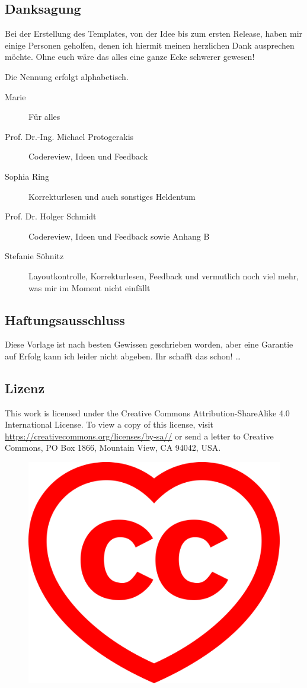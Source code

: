 \subsection{Danksagung}%
\label{sec:thx}
Bei der Erstellung des Templates, von der Idee bis zum ersten Release, haben mir einige Personen geholfen, denen ich hiermit meinen herzlichen Dank ausprechen möchte. Ohne euch wäre das alles eine ganze Ecke schwerer gewesen! 

Die Nennung erfolgt alphabetisch.
\begin{description}
  \item[Marie] Für alles
  \item[Prof. Dr.-Ing. Michael Protogerakis] Codereview, Ideen und Feedback
  \item[Sophia Ring] Korrekturlesen und auch sonstiges Heldentum
  \item[Prof. Dr. Holger Schmidt] Codereview, Ideen und Feedback sowie Anhang B
  \item[Stefanie Söhnitz] Layoutkontrolle, Korrekturlesen, Feedback und ver\-mut\-lich noch viel mehr, was mir im Moment nicht einfällt
\end{description}%
\subsection{Haftungsausschluss}%
\label{sec:haftausschl}
Diese Vorlage ist nach besten Gewissen geschrieben worden, aber eine Garantie auf Erfolg kann ich leider nicht abgeben. Ihr schafft das schon!
\dots%
\subsection{Lizenz}%
\label{sec:licence}
This work is licensed under the Creative Commons Attribution-ShareAlike 4.0 International License. To view a copy of this license, visit \href{https://creativecommons.org/licenses/by-sa/4.0/}{https://creativecommons.org/\-licenses/\-by-sa//} or send a letter to Creative Commons, PO Box 1866, Mountain View, CA 94042, USA.
\begin{figure}[hb]
  \centering
  \includegraphics[width=0.7\columnwidth]{graphics/ccheart_red.pdf}
\end{figure}%
